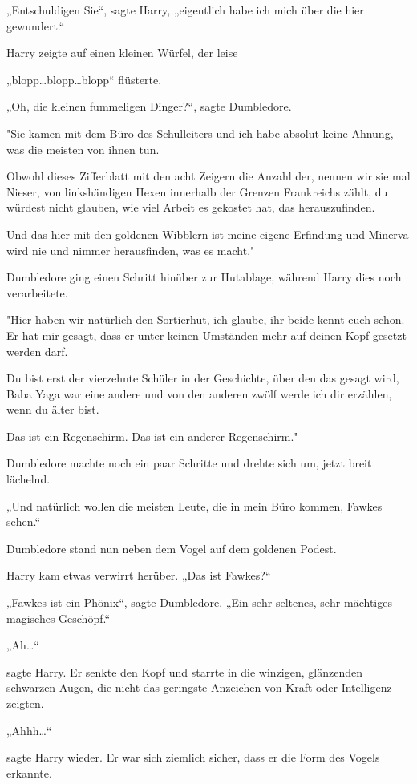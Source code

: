 {„Entschuldigen Sie“, sagte Harry, „eigentlich habe ich mich über die hier gewundert.“

Harry zeigte auf einen kleinen Würfel, der leise

„blopp…blopp…blopp“ flüsterte.

„Oh, die kleinen fummeligen Dinger?“, sagte Dumbledore.

"Sie kamen mit dem Büro des Schulleiters und ich habe absolut keine Ahnung, was die meisten von ihnen tun.

Obwohl dieses Zifferblatt mit den acht Zeigern die Anzahl der, nennen wir sie mal Nieser, von linkshändigen Hexen innerhalb der Grenzen Frankreichs zählt, du würdest nicht glauben, wie viel Arbeit es gekostet hat, das herauszufinden.

Und das hier mit den goldenen Wibblern ist meine eigene Erfindung und Minerva wird nie und nimmer herausfinden, was es macht."

Dumbledore ging einen Schritt hinüber zur Hutablage, während Harry dies noch verarbeitete.

"Hier haben wir natürlich den Sortierhut, ich glaube, ihr beide kennt euch schon. Er hat mir gesagt, dass er unter keinen Umständen mehr auf deinen Kopf gesetzt werden darf.

Du bist erst der vierzehnte Schüler in der Geschichte, über den das gesagt wird, Baba Yaga war eine andere und von den anderen zwölf werde ich dir erzählen, wenn du älter bist.

Das ist ein Regenschirm. Das ist ein anderer Regenschirm."

Dumbledore machte noch ein paar Schritte und drehte sich um, jetzt breit lächelnd.

„Und natürlich wollen die meisten Leute, die in mein Büro kommen, Fawkes sehen.“

Dumbledore stand nun neben dem Vogel auf dem goldenen Podest.

Harry kam etwas verwirrt herüber. „Das ist Fawkes?“

„Fawkes ist ein Phönix“, sagte Dumbledore. „Ein sehr seltenes, sehr mächtiges magisches Geschöpf.“

„Ah…“

sagte Harry. Er senkte den Kopf und starrte in die winzigen, glänzenden schwarzen Augen, die nicht das geringste Anzeichen von Kraft oder Intelligenz zeigten.

„Ahhh…“

sagte Harry wieder. Er war sich ziemlich sicher, dass er die Form des Vogels erkannte.

}
